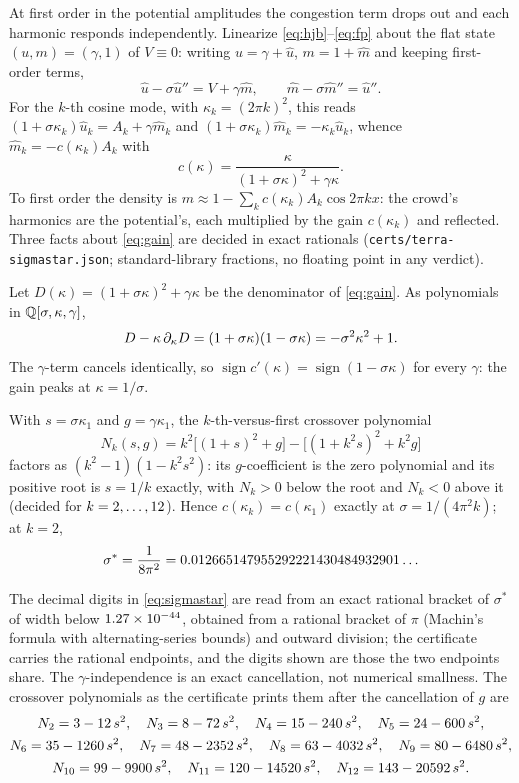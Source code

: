 \documentclass[11pt]{article}
\begin{document}
At first order in the potential amplitudes the congestion term drops out and
each harmonic responds independently. Linearize
\eqref{eq:hjb}--\eqref{eq:fp} about the flat state $(u,m)=(\gamma,1)$ of
$V\equiv0$: writing $u=\gamma+\hat u$, $m=1+\hat m$ and keeping first-order
terms,
\[
\hat u-\sigma\hat u''=V+\gamma\hat m,\qquad \hat m-\sigma\hat m''=\hat u'' .
\]
For the $k$-th cosine mode, with $\kappa_k=(2\pi k)^2$, this reads
$(1+\sigma\kappa_k)\hat u_k=A_k+\gamma\hat m_k$ and
$(1+\sigma\kappa_k)\hat m_k=-\kappa_k\hat u_k$, whence
$\hat m_k=-c(\kappa_k)A_k$ with
\begin{equation}\label{eq:gain}
c(\kappa)=\frac{\kappa}{(1+\sigma\kappa)^2+\gamma\kappa}.
\end{equation}
To first order the density is $m\approx1-\sum_k c(\kappa_k)A_k\cos 2\pi kx$:
the crowd's harmonics are the potential's, each multiplied by the gain
$c(\kappa_k)$ and reflected. Three facts about \eqref{eq:gain} are decided in
exact rationals (\texttt{certs/terra-sigmastar.json}; standard-library
fractions, no floating point in any verdict).

\begin{proposition}\label{prop:bandpass}
Let $D(\kappa)=(1+\sigma\kappa)^2+\gamma\kappa$ be the denominator of
\eqref{eq:gain}. As polynomials in $\mathbb{Q}[\sigma,\kappa,\gamma]$,
\[
D-\kappa\,\partial_\kappa D=(1+\sigma\kappa)(1-\sigma\kappa)=-\sigma^2 \kappa^2 + 1 .
\]
The $\gamma$-term cancels identically, so
$\operatorname{sign}c'(\kappa)=\operatorname{sign}(1-\sigma\kappa)$ for every
$\gamma$: the gain peaks at $\kappa=1/\sigma$.
\end{proposition}

\begin{proposition}\label{prop:crossover}
With $s=\sigma\kappa_1$ and $g=\gamma\kappa_1$, the $k$-th-versus-first
crossover polynomial
\[
N_k(s,g)=k^2\bigl[(1+s)^2+g\bigr]-\bigl[(1+k^2s)^2+k^2g\bigr]
\]
factors as $(k^2-1)(1-k^2s^2)$: its $g$-coefficient is the zero polynomial and
its positive root is $s=1/k$ exactly, with $N_k>0$ below the root and $N_k<0$
above it (decided for $k=2,\dots,12$). Hence $c(\kappa_k)=c(\kappa_1)$
exactly at $\sigma=1/(4\pi^2k)$; at $k=2$,
\begin{equation}\label{eq:sigmastar}
\sigma^*=\frac{1}{8\pi^2}=0.012665147955292221430484932901\ldots
\end{equation}
\end{proposition}

The decimal digits in \eqref{eq:sigmastar} are read from an exact rational
bracket of $\sigma^*$ of width below $1.27\times10^{-44}$, obtained from a
rational bracket of $\pi$ (Machin's formula with alternating-series bounds)
and outward division; the certificate carries the rational endpoints, and the
digits shown are those the two endpoints share. The $\gamma$-independence is
an exact cancellation, not numerical smallness. The crossover polynomials as
the certificate prints them after the cancellation of $g$ are
\begin{gather*}
N_{2} = 3 - 12\, s^2,\quad N_{3} = 8 - 72\, s^2,\quad N_{4} = 15 - 240\, s^2,\quad N_{5} = 24 - 600\, s^2,\\ N_{6} = 35 - 1260\, s^2,\quad N_{7} = 48 - 2352\, s^2,\quad N_{8} = 63 - 4032\, s^2,\quad N_{9} = 80 - 6480\, s^2,\\ N_{10} = 99 - 9900\, s^2,\quad N_{11} = 120 - 14520\, s^2,\quad N_{12} = 143 - 20592\, s^2 .
\end{gather*}
\end{document}
